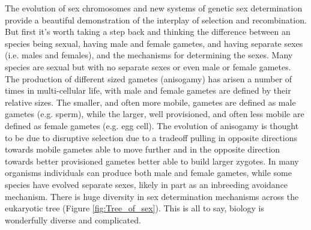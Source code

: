 The evolution of sex chromosomes and new systems of genetic sex determination provide a beautiful demonstration of the interplay of selection and recombination. But first it's worth taking a step back and thinking the difference between an species being sexual, having male and female gametes, and having separate sexes (i.e. males and females), and the mechanisms for determining the sexes. Many species are sexual but with no separate sexes or even male or female gametes. The production of different sized gametes (anisogamy) has arisen a number of times in multi-cellular life, with male and female gametes are defined by their relative sizes. The smaller, and often more mobile, gametes are defined as male gametes  (e.g. sperm), while the larger, well provisioned, and often less mobile are defined as female gametes (e.g. egg cell). The evolution of anisogamy is thought to be due to disruptive selection due to a tradeoff pulling in opposite directions towards mobile gametes able to move further and in the opposite direction towards better provisioned gametes better able to build larger zygotes. In many organisms individuals can produce both male and female gametes, while some species have evolved separate sexes, likely in part as an inbreeding avoidance mechanism. There is huge diversity in sex determination mechanisms across the eukaryotic tree (Figure \ref{fig:Tree_of_sex}). This is all to say, biology is wonderfully diverse and complicated.
